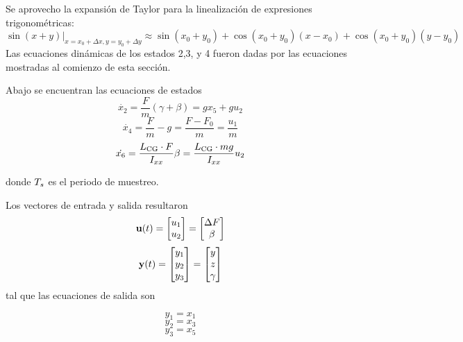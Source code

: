 Se aprovecho la expansión de Taylor para la linealización de expresiones trigonométricas:
\[
\sin(x+y)|_{x=x_0+\Delta x,y=y_0+\Delta y} \approx \sin(x_0+y_0) + \cos(x_0 + y_0) (x-x_0) + \cos(x_0 + y_0) (y-y_0)
\]
Las ecuaciones dinámicas de los estados 2,3, y 4 fueron dadas por las ecuaciones mostradas al comienzo de esta sección.

Abajo se encuentran las ecuaciones de estados
\begin{equation}
	\dot{x_2} = \frac{F}{m} \left( \gamma+\beta \right) = g x_5 + g u_2 
\end{equation}
\begin{equation}
\dot{x_4} = \frac{F}{m} - g =\frac{F-F_0}{m}= \frac{u_1}{m}
\end{equation}
\begin{equation}
\dot{x_6} = \frac{L_{\mathrm{CG}} \cdot F}{I_{xx}} \beta = \frac{L_{\mathrm{CG}} \cdot mg}{I_{xx}} u_2 
\end{equation}

donde $T_s$ es el periodo de muestreo.

Los vectores de entrada y salida resultaron
\[
\mathbf{u}(t) = \begin{bmatrix}
u_1 \\
u_2
\end{bmatrix} = \begin{bmatrix}
\Delta F \\
\beta
\end{bmatrix}
\]
\[
\mathbf{y}(t) = \begin{bmatrix}
y_1 \\
y_2 \\
y_3
\end{bmatrix} = \begin{bmatrix}
y \\
z \\
\gamma
\end{bmatrix}
\]
tal que las ecuaciones de salida son

\begin{equation}
	y_1 = x_1 
\end{equation}
\begin{equation}
	y_2 = x_3
\end{equation}
\begin{equation}
	y_3 = x_5
\end{equation}

